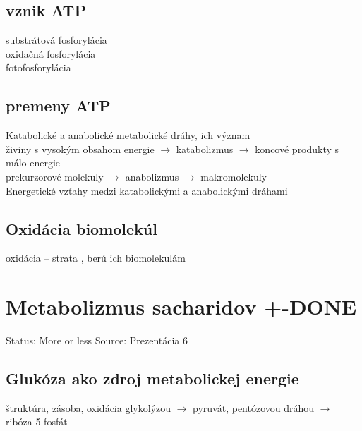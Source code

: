 \subsection{vznik ATP}
substrátová fosforylácia\\
oxidačná fosforylácia\\
fotofosforylácia\\
\subsection{premeny ATP}
Katabolické a anabolické metabolické dráhy, ich význam\\
\tab živiny s vysokým obsahom energie $\rightarrow$ katabolizmus $\rightarrow$ koncové produkty s málo energie\\
\tab prekurzorové molekuly $\rightarrow$ anabolizmus $\rightarrow$ makromolekuly\\
Energetické vzťahy medzi katabolickými a anabolickými dráhami\\

\subsection{Oxidácia biomolekúl}
oxidácia -- strata \el, berú ich biomolekulám
\\
\section{Metabolizmus sacharidov +-DONE}

Status: More or less
Source: Prezentácia 6

\subsection{Glukóza ako zdroj metabolickej energie}
štruktúra, zásoba, oxidácia glykolýzou $\rightarrow$ pyruvát, pentózovou dráhou $\rightarrow$ ribóza-5-fosfát\\
